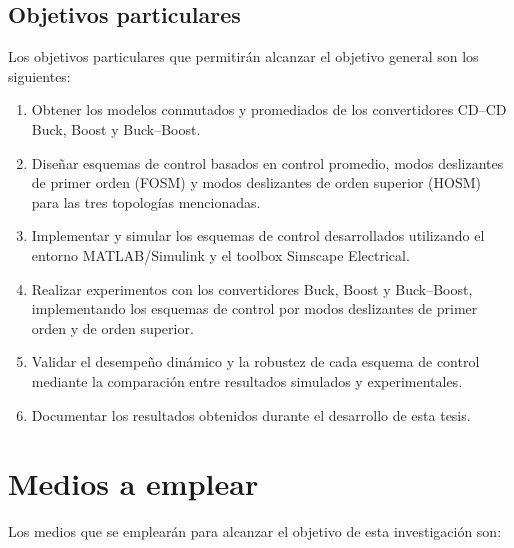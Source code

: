 \documentclass[12pt,oneside,openany]{book}
\begin{document}
\subsection{Objetivos particulares}

Los objetivos particulares que permitirán alcanzar el objetivo general son los siguientes:

\begin{enumerate}
	\item Obtener los modelos conmutados y promediados de los convertidores CD–CD Buck, Boost y Buck–Boost.
	
	\item Diseñar esquemas de control basados en control promedio, modos deslizantes de primer orden (FOSM) y modos deslizantes de orden superior (HOSM) para las tres topologías mencionadas.
	
	\item Implementar y simular los esquemas de control desarrollados utilizando el entorno MATLAB/Simulink y el toolbox Simscape Electrical.
	
	\item Realizar experimentos con los convertidores Buck, Boost y Buck–Boost, implementando los esquemas de control por modos deslizantes de primer orden y de orden superior.
	
	\item Validar el desempeño dinámico y la robustez de cada esquema de control mediante la comparación entre resultados simulados y experimentales.
	
	\item Documentar los resultados obtenidos durante el desarrollo de esta tesis.
\end{enumerate}

\section{Medios a emplear}
Los medios que se emplearán para alcanzar el objetivo de esta investigación son:
\end{document}
